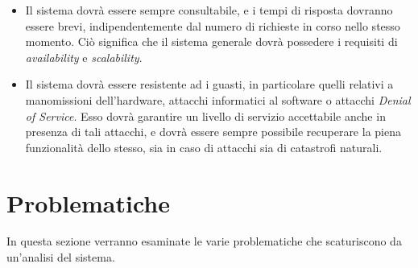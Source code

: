 \documentclass[a4paper,12pt]{report}
\begin{document}
\begin{itemize}
	\item Il sistema dovrà essere sempre consultabile, e i tempi di risposta dovranno essere brevi, indipendentemente dal numero di richieste in corso nello stesso momento. Ciò significa che il sistema generale dovrà possedere i requisiti di \emph{availability} e \emph{scalability}.
	\item Il sistema dovrà essere resistente ad i guasti, in particolare quelli relativi a manomissioni dell'hardware, attacchi informatici al software o attacchi \emph{Denial of Service}. Esso dovrà garantire un livello di servizio accettabile anche in presenza di tali attacchi, e dovrà essere sempre possibile recuperare la piena funzionalità dello stesso, sia in caso di attacchi sia di catastrofi naturali. 
\end{itemize}
\section{Problematiche}\label{issues}
In questa sezione verranno esaminate le varie problematiche che scaturiscono da un'analisi del sistema.
\end{document}
